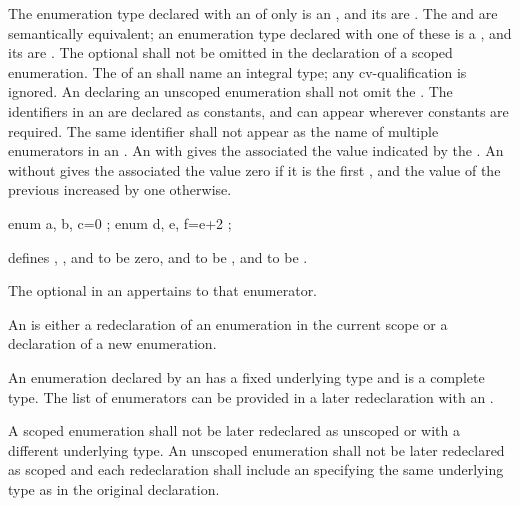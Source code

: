 \pnum
{}%
The enumeration type declared with an 
of only  is an ,
and its  are .
The   and
 are semantically equivalent; an enumeration
type declared with one of these is a ,
and its  are .
The optional  shall not be omitted in the declaration of a scoped enumeration.
The  of an 
shall name an integral type; any cv-qualification is ignored.
An  declaring an unscoped enumeration shall
not omit the .
The identifiers in an  are declared as
constants, and can appear wherever constants are required.
The same identifier shall not appear as
the name of multiple enumerators in an .
%
An  with \tcode{=} gives the associated
 the value indicated by the
.
An  without \tcode{=} gives the associated
 the value zero
if it is the first ,
and the value of the previous 
increased by one otherwise.
\begin{example}
\begin{codeblock}
enum { a, b, c=0 };
enum { d, e, f=e+2 };
\end{codeblock}
defines , , and  to be zero,  and
 to be , and  to be .
\end{example}
The optional  in an
 appertains to that enumerator.

\pnum
An  is either a redeclaration
of an enumeration in the current scope or a declaration of a new enumeration.
\begin{note}
An enumeration declared by an
 has a fixed underlying type and is a
complete type. The list of enumerators can be provided in a later redeclaration
with an .
\end{note}
A scoped enumeration
shall not be later redeclared as unscoped or with a different underlying type.
An unscoped enumeration shall not be later redeclared as scoped and each
redeclaration shall include an  specifying the same
underlying type as in the original declaration.

